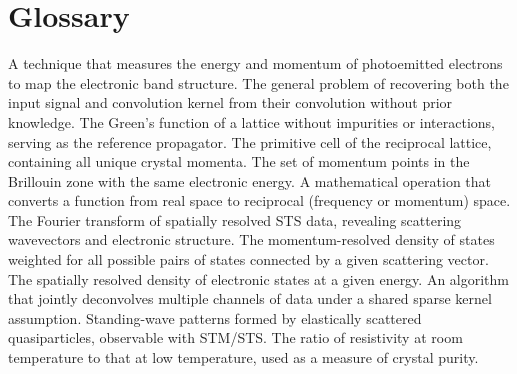 
\chapter{Glossary}



\begin{acronym}
  A technique that measures the energy and momentum of photoemitted electrons to map the electronic band structure.  
  The general problem of recovering both the input signal and convolution kernel from their convolution without prior knowledge.  
  The Green’s function of a lattice without impurities or interactions, serving as the reference propagator.  
  The primitive cell of the reciprocal lattice, containing all unique crystal momenta.  
  The set of momentum points in the Brillouin zone with the same electronic energy.  
  A mathematical operation that converts a function from real space to reciprocal (frequency or momentum) space.  
 The Fourier transform of spatially resolved STS data, revealing scattering wavevectors and electronic structure.  
  The momentum-resolved density of states weighted for all possible pairs of states connected by a given scattering vector.  
 The spatially resolved density of electronic states at a given energy.  
 An algorithm that jointly deconvolves multiple channels of data under a shared sparse kernel assumption.  
 Standing-wave patterns formed by elastically scattered quasiparticles, observable with STM/STS.  
 The ratio of resistivity at room temperature to that at low temperature, used as a measure of crystal purity.  

\end{acronym}
